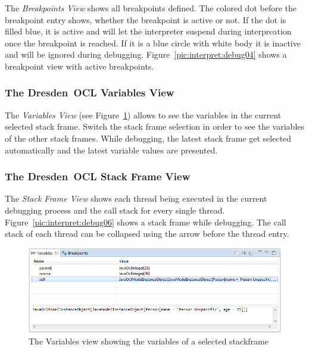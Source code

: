 The \emph{Breakpoints View} shows all breakpoints defined. The colored dot
before the breakpoint entry shows, whether the breakpoint is active or not.
If the dot is filled blue, it is active and will let the interpreter suspend
during interpreation once the breakpoint is reached. If it is a blue circle
with white body it is inactive and will be ignored during debugging.
Figure~\ref{pic:interpret:debug04} shows a breakpoint view with active
breakpoints.

\subsubsection{The Dresden~OCL Variables View}

The \emph{Variables View} (see Figure~\ref{pic:interpret:debug02}) allows to see
the variables in the current selected stack frame. Switch the stack frame
selection in order to see the variables of the other stack frames. While
debugging, the latest stack frame get selected automatically and the latest
variable values are presented.

\subsubsection{The Dresden~OCL Stack Frame View}

The \emph{Stack Frame View} shows each thread being executed in the current
debugging process and the call stack for every single thread.
Figure~\ref{pic:interpret:debug06} shows a stack frame while debugging. The
call stack of each thread can be collapsed using the arrow before the thread
entry.

\begin{figure}[tbp]
	\centering
	\includegraphics[width=\textwidth,height=\textheight,keepaspectratio]{figures/interpreter/debug02}
  \caption{The Variables view showing the variables of a selected stackframe}
  \label{pic:interpret:debug02}
\end{figure}


